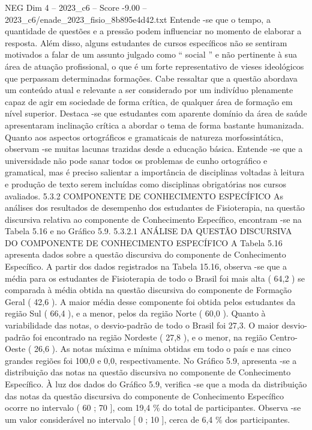 \begin{textsample}{NEG Dim 4 – 2023\_c6 – Score -9.00 – 2023\_c6/enade\_2023\_fisio\_8b895e4d42.txt}
Entende -se que o tempo, a quantidade de questões e a pressão podem influenciar no momento de elaborar a resposta.
Além disso, alguns estudantes de cursos específicos não se sentiram motivados a falar de um assunto julgado como “ social ” e não pertinente à sua área de atuação profissional, o que é um forte representativo de vieses ideológicos que perpassam determinadas formações.
Cabe ressaltar que a questão abordava um conteúdo atual e relevante a ser considerado por um indivíduo plenamente capaz de agir em sociedade de forma crítica, de qualquer área de formação em nível superior.
Destaca -se que estudantes com aparente domínio da área de saúde apresentaram inclinação crítica a abordar o tema de forma bastante humanizada.
Quanto aos aspectos ortográficos e gramaticais de natureza morfossintática, observam -se muitas lacunas trazidas desde a educação básica.
Entende -se que a universidade não pode sanar todos os problemas de cunho ortográfico e gramatical, mas é preciso salientar a importância de disciplinas voltadas à leitura e produção de texto serem incluídas como disciplinas obrigatórias nos cursos avaliados. 5.3.2 COMPONENTE DE CONHECIMENTO ESPECÍFICO As análises dos resultados de desempenho dos estudantes de Fisioterapia, na questão discursiva relativa ao componente de Conhecimento Específico, encontram -se na Tabela 5.16 e no Gráfico 5.9. 5.3.2.1 ANÁLISE DA QUESTÃO DISCURSIVA DO COMPONENTE DE CONHECIMENTO ESPECÍFICO A Tabela 5.16 apresenta dados sobre a questão discursiva do componente de Conhecimento Específico.
A partir dos dados registrados na Tabela 15.16, observa -se que a média para os estudantes de Fisioterapia de todo o Brasil foi mais alta ( 64,2 ) se comparada à média obtida na questão discursiva do componente de Formação Geral ( 42,6 ).
A maior média desse componente foi obtida pelos estudantes da região Sul ( 66,4 ), e a menor, pelos da região Norte ( 60,0 ).
Quanto à variabilidade das notas, o desvio-padrão de todo o Brasil foi 27,3.
O maior desvio-padrão foi encontrado na região Nordeste ( 27,8 ), e o menor, na região Centro-Oeste ( 26,6 ).
As notas máxima e mínima obtidas em todo o país e nas cinco grandes regiões foi 100,0 e 0,0, respectivamente.
No Gráfico 5.9, apresenta -se a distribuição das notas na questão discursiva no componente de Conhecimento Específico.
À luz dos dados do Gráfico 5.9, verifica -se que a moda da distribuição das notas da questão discursiva do componente de Conhecimento Específico ocorre no intervalo ( 60 ; 70 ], com 19,4 \% do total de participantes.
Observa -se um valor considerável no intervalo [ 0 ; 10 ], cerca de 6,4 \% dos participantes.

\end{textsample}
